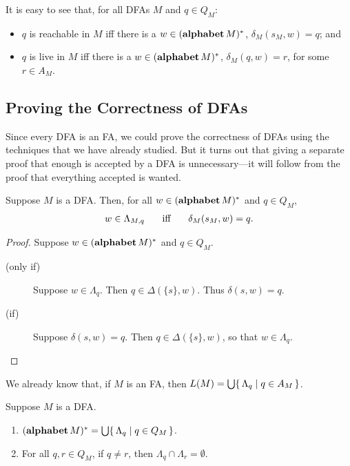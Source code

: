 It is easy to see that, for all DFAs $M$ and $q\in Q_M$:
\begin{itemize}
\item $q$ is reachable in $M$ iff there is a $w\in(\mathbf{alphabet}\, M)^*$,
  $\delta_M(s_M, w) = q$;
%
%
and

\item $q$ is live in $M$ iff there is a $w\in(\mathbf{alphabet}\, M)^*$,
  $\delta_M(q, w) = r$, for some $r\in A_M$.
%
%
\end{itemize}

\subsection{Proving the Correctness of DFAs}

%
Since every DFA is an FA, we could prove the correctness of DFAs
using the techniques that we have already studied.
But it turns out that giving a separate proof that enough is accepted
by a DFA is unnecessary---it will follow from the proof that
everything accepted is wanted.

\begin{proposition}
Suppose $M$ is a DFA.  Then, for all $w\in(\mathbf{alphabet}\,M)^*$ and $q\in Q_M$,
\begin{gather*}
w\in\Lambda_{M,q} \quad\mathrel{\;\;\allowbreak\mbox{iff}\allowbreak\;\;}\quad \delta_M(s_M,w) = q .
\end{gather*}
\end{proposition}

\begin{proof}
Suppose $w\in(\mathbf{alphabet}\,M)^*$ and $q\in Q_M$.
\begin{description}
\item[\quad(only if)] Suppose $w\in\Lambda_q$.  Then
  $q\in\Delta(\{s\},w)$.  Thus $\delta(s,w) = q$.

\item[\quad(if)] Suppose $\delta(s,w) = q$.  Then
  $q\in\Delta(\{s\},w)$, so that $w\in\Lambda_q$.
\end{description}
\end{proof}

We already know that, if $M$ is an FA, then
$L(M)=\bigcup\{ \, \Lambda_q \mid q\in A_M \, \}$.

\begin{proposition}
Suppose $M$ is a DFA.
\begin{enumerate}[\quad(1)]
\item $(\mathbf{alphabet}\,M)^* = \bigcup\{ \, \Lambda_q \mid q\in Q_M \, \}$.

\item For all $q,r\in Q_M$, if $q\neq r$, then
  $\Lambda_q\cap\Lambda_r=\emptyset$.
\end{enumerate}
\end{proposition}

